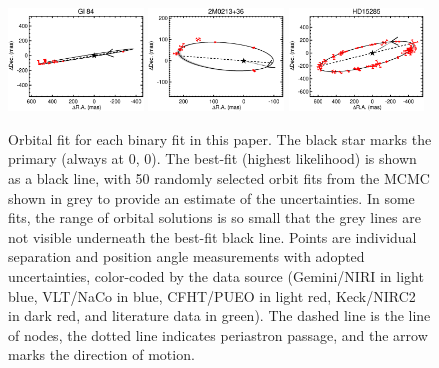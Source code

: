 \documentclass[twocolumn]{aastex62}
\begin{document}
\begin{figure}[htp]
\begin{center}
\includegraphics[width=0.32\textwidth]{Orbits/HIP9724AB.eps} %
\includegraphics[width=0.32\textwidth]{Orbits/PMJ02133+3648AB.eps} 
\includegraphics[width=0.32\textwidth]{Orbits/HD15285AB.eps} %
\caption{Orbital fit for each binary fit in this paper. The black star marks the primary (always at 0, 0). The best-fit (highest likelihood) is shown as a black line, with 50 randomly selected orbit fits from the MCMC shown in grey to provide an estimate of the uncertainties. In some fits, the range of orbital solutions is so small that the grey lines are not visible underneath the best-fit black line. Points are individual separation and position angle measurements with adopted uncertainties, color-coded by the data source (Gemini/NIRI in light blue, VLT/NaCo in blue, CFHT/PUEO in light red, Keck/NIRC2 in dark red, and literature data in green). The dashed line is the line of nodes, the dotted line indicates periastron passage, and the arrow marks the direction of motion. }
\label{fig:orbits1}
\end{center}
\end{figure}
\end{document}
